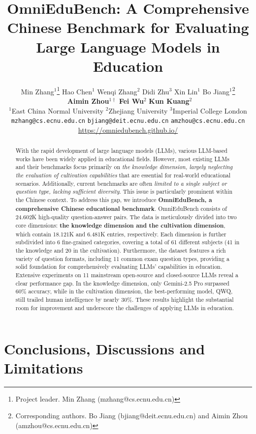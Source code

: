 \documentclass{article} %
\title{OmniEduBench: A Comprehensive Chinese Benchmark for Evaluating Large Language Models in Education}
\author{
Min Zhang$^{1}$\thanks{Project leader. Min Zhang (mzhang@cs.ecnu.edu.cn) } \quad 
Hao Chen$^{1}$ \quad 
Wenqi Zhang$^{2}$ \quad 
Didi Zhu$^{3}$ \quad 
Xin Lin$^{1}$ \quad 
Bo Jiang$^{1}$\thanks{Corresponding authors. Bo Jiang (bjiang@deit.ecnu.edu.cn) and Aimin Zhou (amzhou@cs.ecnu.edu.cn)} \\[0.3em] 
\ \textbf{Aimin Zhou}$^{1\dagger}$ \quad 
\textbf{Fei Wu}$^{2}$ \quad 
\textbf{Kun Kuang}$^{2}$ \\[0.3em]
$^{1}$East China Normal University \quad 
$^{2}$Zhejiang University \quad 
$^{3}$Imperial College London \\[0.3em]
{\tt\small mzhang@cs.ecnu.edu.cn} \quad
{\tt\small bjiang@deit.ecnu.edu.cn} \quad
{\tt\small amzhou@cs.ecnu.edu.cn} \\[0.5em]
\quad \quad \quad \quad \quad \quad \quad \quad \quad \quad \url{https://omniedubench.github.io/}
}
\begin{document}
\maketitle

\begin{abstract}
    With the rapid development of large language models (LLMs), various LLM-based works have been widely applied in educational fields. However, most existing LLMs and their benchmarks focus primarily on \textit{the knowledge dimension, largely neglecting the evaluation of cultivation capabilities} that are essential for real-world educational scenarios. Additionally, current benchmarks are often \textit{limited to a single subject or question type, lacking sufficient diversity}. This issue is particularly prominent within the Chinese context. To address this gap, we introduce \textbf{OmniEduBench, a comprehensive Chinese educational benchmark}. OmniEduBench consists of 24.602K high-quality question-answer pairs. The data is meticulously divided into two core dimensions: \textbf{the knowledge dimension and the cultivation dimension}, which contain 18.121K and 6.481K entries, respectively. Each dimension is further subdivided into 6 fine-grained categories, covering a total of 61 different subjects (41 in the knowledge and 20 in the cultivation). Furthermore, the dataset features a rich variety of question formats, including 11 common exam question types, providing a solid foundation for comprehensively evaluating LLMs' capabilities in education. Extensive experiments on 11 mainstream open-source and closed-source LLMs reveal a clear performance gap. In the knowledge dimension, only Gemini-2.5 Pro surpassed 60\% accuracy, while in the cultivation dimension, the best-performing model, QWQ, still trailed human intelligence by nearly 30\%. These results highlight the substantial room for improvement and underscore the challenges of applying LLMs in education.
\end{abstract}






\section{Conclusions, Discussions and Limitations}
\end{document}
